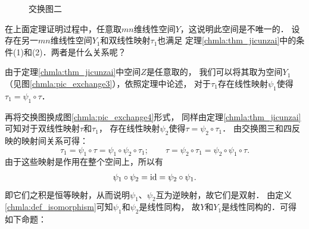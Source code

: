 \begin{figure}[htb]
    \begin{minipage}[t]{0.49\textwidth}
    \centering
    \caption{交换图一}\label{chmla:pic_exchange1}
    \end{minipage}
    \begin{minipage}[t]{0.49\textwidth}
    \caption{交换图二}\label{chmla:pic_exchange2}
    \end{minipage}
\end{figure}


在上面定理证明过程中，任意取$mn$维线性空间$Y$，这说明此空间是不唯一的．
设存在另一$mn$维线性空间$Y_1$和双线性映射$\tau_1$也满足
定理\ref{chmla:thm_jicunzai}中的条件(1)和(2)．两者是什么关系呢？

由于定理\ref{chmla:thm_jicunzai}中空间$Z$是任意取的，
我们可以将其取为空间$Y_1$（见图\ref{chmla:pic_exchange3}），依照定理中论述，
对于$\tau_1$存在线性映射$\psi_1$使得$\tau_1=\psi_1 \circ \tau$．

再将交换图换成图\ref{chmla:pic_exchange4}形式，
同样由定理\ref{chmla:thm_jicunzai}可知对于双线性映射$\tau$和$\tau_1$，
存在线性映射$\psi_2$使得$\tau=\psi_2 \circ \tau_1$．
由交换图三和四反映的映射间关系可得：
\begin{equation}
    \tau_1 =\psi_1 \circ \tau = \psi_1 \circ \psi_2 \circ \tau_1; \qquad
    \tau =\psi_2 \circ \tau_1 =\psi_2 \circ\psi_1 \circ \tau .
\end{equation}
由于这些映射是作用在整个空间上，所以有
\begin{align}
    \psi_1 \circ \psi_2 = {\rm id} = \psi_2 \circ\psi_1 .
\end{align}
即它们之积是恒等映射，从而说明$\psi_1$、$\psi_2$互为逆映射，故它们是双射．
由定义\ref{chmla:def_isomorphism}可知$\psi_1$和$\psi_2$是线性同构，
故$Y$和$Y_1$是线性同构的．可得如下命题：

